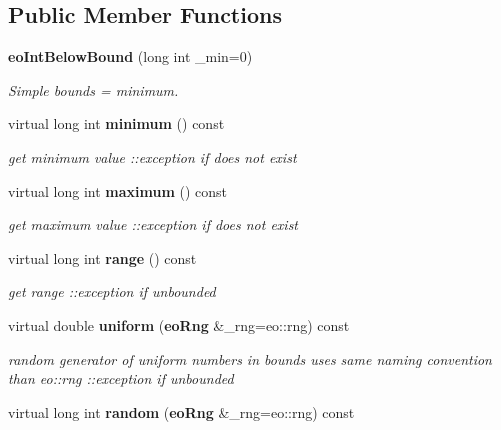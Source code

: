 \subsection*{Public Member Functions}
\begin{CompactItemize}
\item 
{\bf eo\-Int\-Below\-Bound} (long int \_\-min=0)\label{classeo_int_below_bound_a1}

\begin{CompactList}\small\item\em Simple bounds = minimum. \item\end{CompactList}\item 
virtual long int {\bf minimum} () const \label{classeo_int_below_bound_a2}

\begin{CompactList}\small\item\em get minimum value ::exception if does not exist \item\end{CompactList}\item 
virtual long int {\bf maximum} () const \label{classeo_int_below_bound_a3}

\begin{CompactList}\small\item\em get maximum value ::exception if does not exist \item\end{CompactList}\item 
virtual long int {\bf range} () const \label{classeo_int_below_bound_a4}

\begin{CompactList}\small\item\em get range ::exception if unbounded \item\end{CompactList}\item 
virtual double {\bf uniform} ({\bf eo\-Rng} \&\_\-rng=eo::rng) const \label{classeo_int_below_bound_a5}

\begin{CompactList}\small\item\em random generator of uniform numbers in bounds uses same naming convention than eo::rng ::exception if unbounded \item\end{CompactList}\item 
virtual long int {\bf random} ({\bf eo\-Rng} \&\_\-rng=eo::rng) const \label{classeo_int_below_bound_a6}


\end{CompactItemize}
